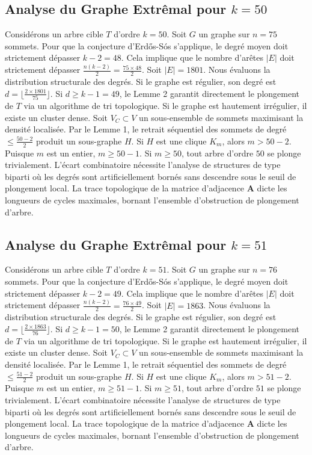 \documentclass[11pt,a4paper]{article}
\begin{document}
\subsection{Analyse du Graphe Extr\^emal pour $k=50$}
Consid\'erons un arbre cible $T$ d'ordre $k=50$.
Soit $G$ un graphe sur $n=75$ sommets.
Pour que la conjecture d'Erd\H{o}s-S\'os s'applique, le degr\'e moyen doit strictement d\'epasser $k-2 = 48$.
Cela implique que le nombre d'ar\^etes $|E|$ doit strictement d\'epasser $\frac{n(k-2)}{2} = \frac{75 \times 48}{2}$.
Soit $|E| = 1801$.
Nous \'evaluons la distribution structurale des degr\'es. Si le graphe est r\'egulier, son degr\'e est $d = \lfloor \frac{2 \times 1801}{75} \rfloor$.
Si $d \geq k-1 = 49$, le Lemme 2 garantit directement le plongement de $T$ via un algorithme de tri topologique.
Si le graphe est hautement irr\'egulier, il existe un cluster dense. Soit $V_C \subset V$ un sous-ensemble de sommets maximisant la densit\'e localis\'ee.
Par le Lemme 1, le retrait s\'equentiel des sommets de degr\'e $\leq \frac{50-2}{2}$ produit un sous-graphe $H$.
Si $H$ est une clique $K_{m}$, alors $m > 50-2$. Puisque $m$ est un entier, $m \geq 50-1$. Si $m \geq 50$, tout arbre d'ordre $50$ se plonge trivialement.
L'\'ecart combinatoire n\'ecessite l'analyse de structures de type biparti o\`u les degr\'es sont artificiellement born\'es sans descendre sous le seuil de plongement local. La trace topologique de la matrice d'adjacence $\mathbf{A}$ dicte les longueurs de cycles maximales, bornant l'ensemble d'obstruction de plongement d'arbre.


\subsection{Analyse du Graphe Extr\^emal pour $k=51$}
Consid\'erons un arbre cible $T$ d'ordre $k=51$.
Soit $G$ un graphe sur $n=76$ sommets.
Pour que la conjecture d'Erd\H{o}s-S\'os s'applique, le degr\'e moyen doit strictement d\'epasser $k-2 = 49$.
Cela implique que le nombre d'ar\^etes $|E|$ doit strictement d\'epasser $\frac{n(k-2)}{2} = \frac{76 \times 49}{2}$.
Soit $|E| = 1863$.
Nous \'evaluons la distribution structurale des degr\'es. Si le graphe est r\'egulier, son degr\'e est $d = \lfloor \frac{2 \times 1863}{76} \rfloor$.
Si $d \geq k-1 = 50$, le Lemme 2 garantit directement le plongement de $T$ via un algorithme de tri topologique.
Si le graphe est hautement irr\'egulier, il existe un cluster dense. Soit $V_C \subset V$ un sous-ensemble de sommets maximisant la densit\'e localis\'ee.
Par le Lemme 1, le retrait s\'equentiel des sommets de degr\'e $\leq \frac{51-2}{2}$ produit un sous-graphe $H$.
Si $H$ est une clique $K_{m}$, alors $m > 51-2$. Puisque $m$ est un entier, $m \geq 51-1$. Si $m \geq 51$, tout arbre d'ordre $51$ se plonge trivialement.
L'\'ecart combinatoire n\'ecessite l'analyse de structures de type biparti o\`u les degr\'es sont artificiellement born\'es sans descendre sous le seuil de plongement local. La trace topologique de la matrice d'adjacence $\mathbf{A}$ dicte les longueurs de cycles maximales, bornant l'ensemble d'obstruction de plongement d'arbre.
\end{document}
